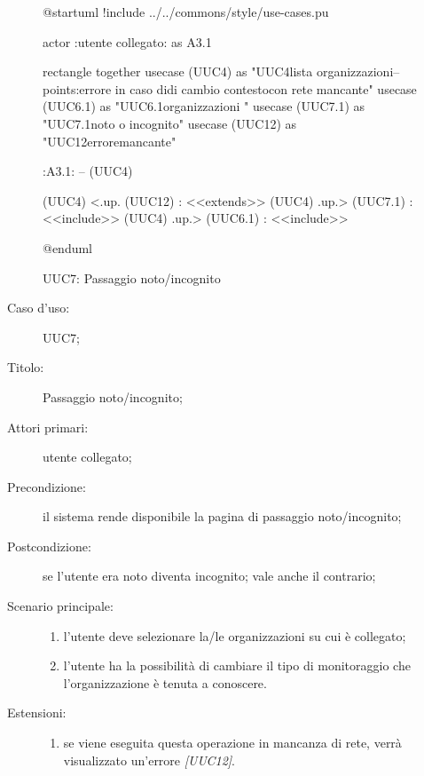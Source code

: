 \documentclass[../../../analisi-dei-requisiti.tex]{subfiles}
\begin{document}
\begin{figure}[H]
  \centering
  \begin{plantuml}
  @startuml
  !include ../../commons/style/use-cases.pu

  actor :utente collegato: as A3.1

  rectangle {
    together {
      usecase (UUC4) as "UUC4\nRecupero lista organizzazioni\n--\nExtension points:\nVisualizzazione errore in caso di\noperazione di cambio contesto\n con rete mancante"
      usecase (UUC6.1) as "UUC6.1\nFiltra organizzazioni \ncollegato"
      usecase (UUC7.1) as "UUC7.1\nScelta noto o incognito"
      usecase (UUC12) as "UUC12\nVisualizzazione errore\nrete mancante"
    }
  }

  :A3.1: -- (UUC4)

  (UUC4) <.up. (UUC12) : <<extends>>
  (UUC4) .up.> (UUC7.1) : <<include>>
  (UUC4) .up.> (UUC6.1) : <<include>>


  @enduml
  \end{plantuml}
  \caption{UUC7: Passaggio noto/incognito}%
  \label{fig:uuc7}
\end{figure}

\begin{description}
  \item[Caso d’uso:] UUC7;
  \item[Titolo:] Passaggio noto/incognito;
  \item[Attori primari:] utente collegato;
  \item[Precondizione:] il sistema rende disponibile la pagina di passaggio noto/incognito;
  \item[Postcondizione:] se l'utente era noto diventa incognito; vale anche il contrario;
  \item[Scenario principale:]
        \begin{enumerate}
          \item l'utente deve selezionare la/le organizzazioni su cui è collegato;
          \item l'utente ha la possibilità di cambiare il tipo di monitoraggio che l'organizzazione è tenuta a conoscere.
        \end{enumerate}
  \item[Estensioni:]
        \begin{enumerate}
          \item se viene eseguita questa operazione in mancanza di rete, verrà visualizzato un'errore \emph{[UUC12]}.
        \end{enumerate}
\end{description}
\end{document}
